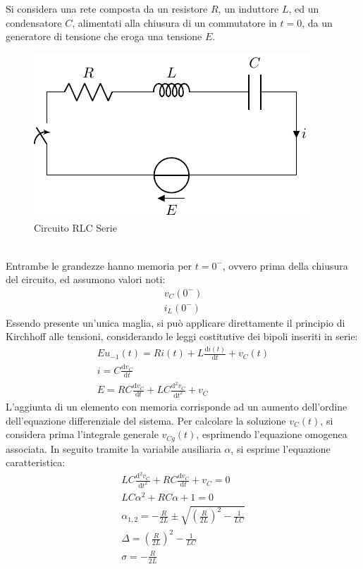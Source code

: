 \documentclass{article}
\newcommand{\df}{\mathrm{d}}
\numberwithin{equation}{subsection}
\begin{document}
Si considera una rete composta da un resistore $R$, un induttore $L$, ed un condensatore $C$, alimentati alla chiusura di un commutatore in $t=0$, da un generatore 
di tensione che eroga una tensione $E$.
\begin{figure}[ht]%
    \centering
    \includegraphics{circuito-rlc-serie.pdf}
    \caption{Circuito RLC Serie}
    \label{fig:circuito-rlc-serie}
\end{figure}
\\
Entrambe le grandezze hanno memoria per $t=0^-$, ovvero prima della chiusura del circuito, ed assumono valori noti: 
\begin{gather*}
    v_C(0^-)\\
    i_L(0^-)
\end{gather*}
Essendo presente un'unica maglia, si può applicare direttamente il principio di Kirchhoff alle tensioni, considerando le leggi costitutive dei bipoli inseriti in serie:
\begin{gather*}
    Eu_{-1}(t)=Ri(t)+\displaystyle L\frac{\df i(t)}{\df t}+v_C(t)\\
    i=\displaystyle C\frac{\df v_C}{\df t}\\
    E=RC\displaystyle\frac{\df v_C}{\df t}+LC\frac{\df^2v_C}{\df t^2}+v_C
\end{gather*}
L'aggiunta di un elemento con memoria corrisponde ad un aumento dell'ordine dell'equazione differenziale del sistema. 
Per calcolare la soluzione $v_C(t)$, si considera prima l'integrale generale $v_{Cg}(t)$, esprimendo l'equazione omogenea associata. In seguito tramite la variabile ausiliaria 
$\alpha$, si esprime l'equazione caratteristica:
\begin{gather*}
    LC\frac{\df^2v_C}{\df t^2}+RC\displaystyle\frac{\df v_C}{\df t}+v_C=0\\
    LC\alpha^2+RC\alpha+1=0\\
    \alpha_{1,2}=\displaystyle-\frac{R}{2L}\pm\sqrt{\left(\frac{R}{2L}\right)^2-\frac{1}{LC}}\\
    \Delta=\displaystyle\left(\frac{R}{2L}\right)^2-\frac{1}{LC}\\
    \sigma=\displaystyle-\frac{R}{2L}
\end{gather*}
\end{document}
